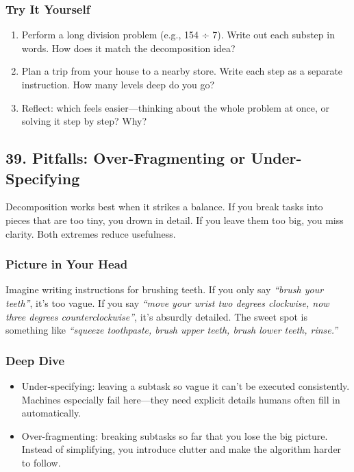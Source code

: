 \documentclass[
  letterpaper,
  DIV=11,
  numbers=noendperiod]{scrreprt}
\providecommand{\tightlist}{%
  \setlength{\itemsep}{0pt}\setlength{\parskip}{0pt}}
\begin{document}
\subsubsection{Try It Yourself}\label{try-it-yourself-37}

\begin{enumerate}
\def\labelenumi{\arabic{enumi}.}
\tightlist
\item
  Perform a long division problem (e.g., 154 ÷ 7). Write out each
  substep in words. How does it match the decomposition idea?
\item
  Plan a trip from your house to a nearby store. Write each step as a
  separate instruction. How many levels deep do you go?
\item
  Reflect: which feels easier---thinking about the whole problem at
  once, or solving it step by step? Why?
\end{enumerate}

\subsection{39. Pitfalls: Over-Fragmenting or
Under-Specifying}\label{pitfalls-over-fragmenting-or-under-specifying}

Decomposition works best when it strikes a balance. If you break tasks
into pieces that are too tiny, you drown in detail. If you leave them
too big, you miss clarity. Both extremes reduce usefulness.

\subsubsection{Picture in Your Head}\label{picture-in-your-head-38}

Imagine writing instructions for brushing teeth. If you only say
\emph{``brush your teeth''}, it's too vague. If you say \emph{``move
your wrist two degrees clockwise, now three degrees counterclockwise''},
it's absurdly detailed. The sweet spot is something like \emph{``squeeze
toothpaste, brush upper teeth, brush lower teeth, rinse.''}

\subsubsection{Deep Dive}\label{deep-dive-8}

\begin{itemize}
\tightlist
\item
  Under-specifying: leaving a subtask so vague it can't be executed
  consistently. Machines especially fail here---they need explicit
  details humans often fill in automatically.
\item
  Over-fragmenting: breaking subtasks so far that you lose the big
  picture. Instead of simplifying, you introduce clutter and make the
  algorithm harder to follow.
\end{itemize}
\end{document}
